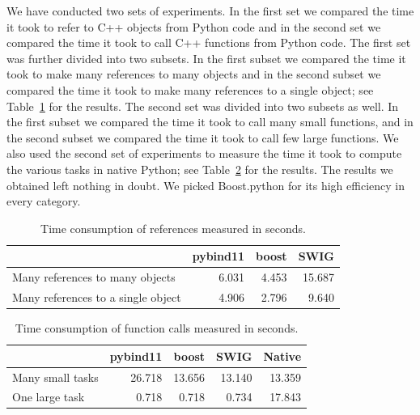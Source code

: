 We have conducted two sets of experiments. In the first set we compared the time it took to refer to C++ objects from Python code and in the second set we compared the time it took to call C++ functions from Python code. The first set was further divided into two subsets. In the first subset we compared the time it took to make many references to many objects and in the second subset we compared the time it took to make many references to a single object; see Table~\ref{tab:res:refs} for the results.
%
The second set was divided into two subsets as well. In the first subset we compared the time it took to call many small functions, and in the second subset we compared the time it took to call few large functions. We also used the second set of experiments to measure the time it took to compute the various tasks in native Python; see Table~\ref{tab:res:calls} for the results.
%
The results we obtained left nothing in doubt.
We picked Boost.python for its high efficiency in every category.

\begin{table}
  \caption{Time consumption of references measured in seconds.}
  \label{tab:res:refs}
  \centering\begin{tabular}{|l|r|r|r|}
    \hline
    & \textbf{pybind11} & \textbf{boost} & \textbf{SWIG}\\
    \hline
    \hline
    Many references to many objects    & 6.031  & 4.453 & 15.687\\
    \hline
    Many references to a single object & 4.906  & 2.796 &  9.640\\
    \hline
  \end{tabular}
\end{table}
\begin{table}
  \caption{Time consumption of function calls measured in seconds.}
  \label{tab:res:calls}
  \centering\begin{tabular}{|l|r|r|r|r|}
    \hline
    & \textbf{pybind11} & \textbf{boost} & \textbf{SWIG} & \textbf{Native}\\
    \hline
    \hline
    Many small tasks & 26.718 & 13.656 & 13.140 & 13.359\\
    \hline
    One large task   & 0.718  & 0.718  & 0.734  & 17.843\\
    \hline
  \end{tabular}
\end{table}

